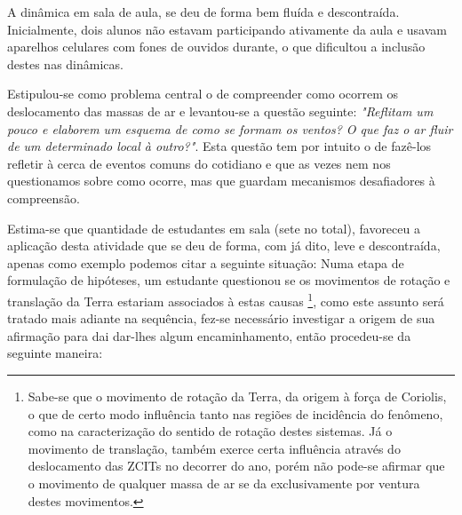 A dinâmica em sala de aula, se deu de forma bem fluída e descontraída. Inicialmente, dois alunos não estavam participando ativamente da aula e usavam aparelhos celulares com fones de ouvidos durante, o que dificultou a inclusão destes nas dinâmicas. 

Estipulou-se como problema central o de compreender como ocorrem os deslocamento das massas de ar e levantou-se a questão seguinte: \textit{"Reflitam um pouco e elaborem um esquema de como se formam os ventos? O que faz o ar fluir de um determinado local à outro?"}. Esta questão tem por intuito o de fazê-los refletir à cerca de eventos comuns do cotidiano e que as vezes nem nos questionamos sobre como ocorre, mas que guardam mecanismos desafiadores à compreensão.

Estima-se que quantidade de estudantes em sala (sete no total), favoreceu a aplicação desta atividade que se deu de forma, com já dito, leve e descontraída, apenas como exemplo podemos citar a seguinte situação: Numa etapa de formulação de hipóteses, um estudante questionou se os movimentos de rotação e translação da Terra estariam associados à estas causas \footnote{Sabe-se que o movimento de rotação da Terra, da origem à força de Coriolis, o que de certo modo influência tanto nas regiões de incidência do fenômeno, como na caracterização do sentido de rotação destes sistemas. Já o movimento de translação, também exerce certa influência através do deslocamento das ZCITs no decorrer do ano, porém não pode-se afirmar que o movimento de qualquer massa de ar se da exclusivamente por ventura destes movimentos.}, como este assunto será tratado mais adiante na sequência, fez-se necessário investigar a origem de sua afirmação para dai dar-lhes algum encaminhamento, então procedeu-se da seguinte maneira:

